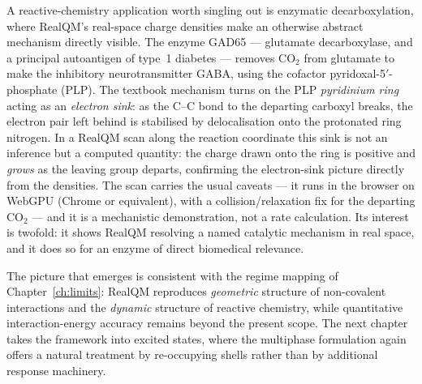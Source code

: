 A reactive-chemistry application worth singling out is enzymatic decarboxylation, where RealQM's real-space
charge densities make an otherwise abstract mechanism directly visible. The enzyme GAD65 --- glutamate
decarboxylase, and a principal autoantigen of type~1 diabetes --- removes CO$_2$ from glutamate to make the
inhibitory neurotransmitter GABA, using the cofactor pyridoxal-5$'$-phosphate (PLP). The textbook mechanism turns
on the PLP \emph{pyridinium ring} acting as an \emph{electron sink}: as the C--C bond to the departing carboxyl
breaks, the electron pair left behind is stabilised by delocalisation onto the protonated ring nitrogen. In a
RealQM scan along the reaction coordinate this sink is not an inference but a computed quantity: the charge drawn
onto the ring is positive and \emph{grows} as the leaving group departs, confirming the electron-sink picture
directly from the densities. The scan carries the usual caveats --- it runs in the browser on WebGPU (Chrome or
equivalent), with a collision/relaxation fix for the departing CO$_2$ --- and it is a mechanistic demonstration,
not a rate calculation. Its interest is twofold: it shows RealQM resolving a named catalytic mechanism in real
space, and it does so for an enzyme of direct biomedical relevance.

The picture that emerges is consistent with the regime mapping of Chapter~\ref{ch:limits}: RealQM reproduces \emph{geometric} structure of non-covalent interactions and the \emph{dynamic} structure of reactive chemistry, while quantitative interaction-energy accuracy remains beyond the present scope. The next chapter takes the framework into excited states, where the multiphase formulation again offers a natural treatment by re-occupying shells rather than by additional response machinery.

